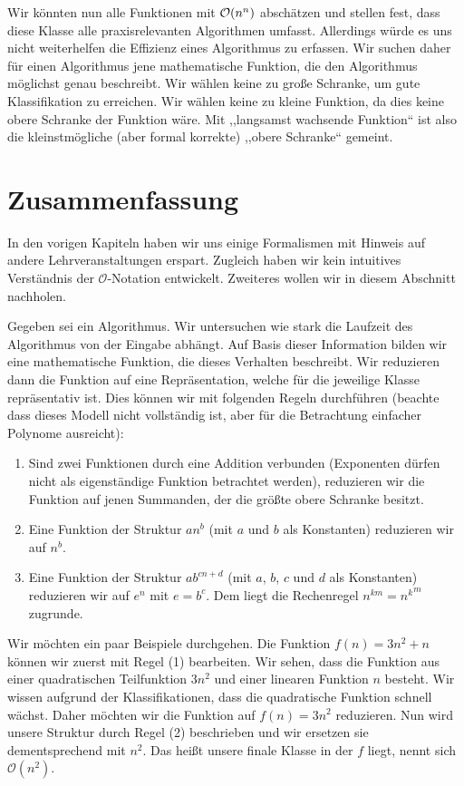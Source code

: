Wir könnten nun alle Funktionen mit $\mathcal{O}\!\left(n^n\right)$ abschätzen und stellen fest, dass diese Klasse alle praxisrelevanten Algorithmen umfasst. Allerdings würde es uns nicht weiterhelfen die Effizienz eines Algorithmus zu erfassen. Wir suchen daher für einen Algorithmus jene mathematische Funktion, die den Algorithmus möglichst genau beschreibt. Wir wählen keine zu große Schranke, um gute Klassifikation zu erreichen. Wir wählen keine zu kleine Funktion, da dies keine obere Schranke der Funktion wäre. Mit ,,langsamst wachsende Funktion`` ist also die kleinstmögliche (aber formal korrekte) ,,obere Schranke`` gemeint.
%
\section{Zusammenfassung}
%
In den vorigen Kapiteln haben wir uns einige Formalismen mit Hinweis auf andere Lehrveranstaltungen erspart. Zugleich haben wir kein intuitives Verständnis der $\mathcal{O}$-Notation entwickelt. Zweiteres wollen wir in diesem Abschnitt nachholen.

Gegeben sei ein Algorithmus. Wir untersuchen wie stark die Laufzeit des Algorithmus von der Eingabe abhängt. Auf Basis dieser Information bilden wir eine mathematische Funktion, die dieses Verhalten beschreibt. Wir reduzieren dann die Funktion auf eine Repräsentation, welche für die jeweilige Klasse repräsentativ ist. Dies können wir mit folgenden Regeln durchführen (beachte dass dieses Modell nicht vollständig ist, aber für die Betrachtung einfacher Polynome ausreicht):
%
\begin{enumerate}
  \item Sind zwei Funktionen durch eine Addition verbunden (Exponenten dürfen nicht als eigenständige Funktion betrachtet werden), reduzieren wir die Funktion auf jenen Summanden, der die größte obere Schranke besitzt.
  \item Eine Funktion der Struktur $an^{b}$ (mit $a$ und $b$ als Konstanten) reduzieren wir auf $n^b$.
  \item Eine Funktion der Struktur $ab^{cn + d}$ (mit $a$, $b$, $c$ und $d$ als Konstanten) reduzieren wir auf $e^n$ mit $e=b^c$. Dem liegt die Rechenregel $n^{km} = {n^k}^m$ zugrunde.
\end{enumerate}

Wir möchten ein paar Beispiele durchgehen. Die Funktion $f(n) = 3n^2 + n$ können wir zuerst mit Regel (1) bearbeiten. Wir sehen, dass die Funktion aus einer quadratischen Teilfunktion $3n^2$ und einer linearen Funktion $n$ besteht. Wir wissen aufgrund der Klassifikationen, dass die quadratische Funktion schnell wächst. Daher möchten wir die Funktion auf $f(n) = 3n^2$ reduzieren. Nun wird unsere Struktur durch Regel (2) beschrieben und wir ersetzen sie dementsprechend mit $n^2$. Das heißt unsere finale Klasse in der $f$ liegt, nennt sich $\mathcal{O}(n^2)$.

